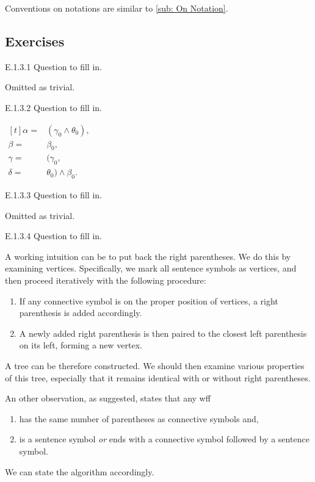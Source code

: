 Conventions on notations are similar to \ref{sub: On Notation}.

\subsection*{Exercises}

\begin{exercise}{E.1.3.1}
  Question to fill in.
\end{exercise}

Omitted as trivial.

\begin{exercise}{E.1.3.2}
  Question to fill in.
\end{exercise}

$\begin{aligned}[t]
    \alpha= & (\gamma_0\wedge\theta_0), \\\beta=&\beta_0,\\\gamma=&(\gamma_0,\\\delta=&\theta_0)\wedge \beta_0.
  \end{aligned}$

\begin{exercise}{E.1.3.3}
  Question to fill in.
\end{exercise}

Omitted as trivial.

\begin{exercise}{E.1.3.4}
  Question to fill in.
\end{exercise}

A working intuition can be to put back the right parentheses. We do this by examining vertices. Specifically, we mark all sentence symbols as vertices, and then proceed iteratively with the following procedure:
\begin{enumerate}
  \item If any connective symbol is on the proper position of vertices, a right parenthesis is added accordingly.
  \item A newly added right parenthesis is then paired to the closest left parenthesis on its left, forming a new vertex.
\end{enumerate}
A tree can be therefore constructed. We should then examine various properties of this tree, especially that it remains identical with or without right parentheses.

An other observation, as suggested, states that any wff
\begin{enumerate}
  \item has the same number of parentheses as connective symbols and,
  \item is a sentence symbol \textit{or} ends with a connective symbol followed by a sentence symbol.
\end{enumerate}
We can state the algorithm accordingly.

